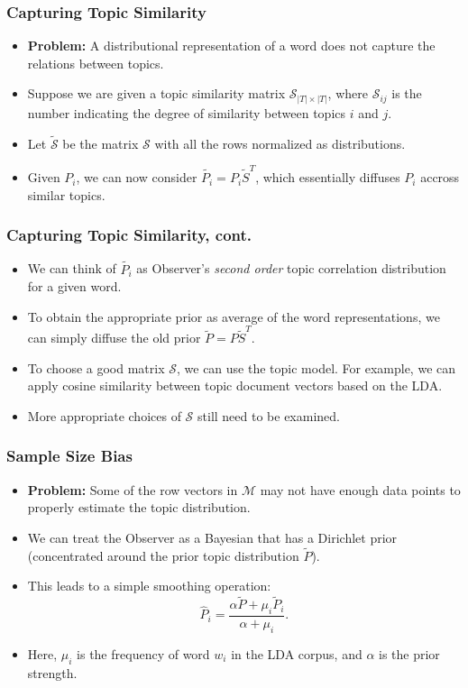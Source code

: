 \documentclass{beamer}
\newcommand\cS{{\mathcal S}}
\newcommand\cM{{\mathcal M}}
\begin{document}
\begin{frame}
\frametitle{Capturing Topic Similarity}
\begin{itemize}
\item {\bf Problem:} A distributional representation of a word does
  not capture the relations between topics.
\item Suppose we are given a topic similarity matrix
  $\cS_{|T|\times|T|}$, where $\cS_{ij}$ is the number indicating
  the degree of similarity between topics $i$ and $j$. 
\item Let $\tilde{\cS}$ be the matrix $\cS$ with all the rows normalized as
  distributions. 
\item Given $P_i$, we can now consider $\tilde{P_i}=P_i\tilde{S}^T$, which
  essentially diffuses $P_i$ accross similar topics.
\end{itemize}
\end{frame}

\begin{frame}
\frametitle{Capturing Topic Similarity, cont.}
\begin{itemize}
\item We can think of $\tilde{P_i}$ as Observer's {\em second order}
  topic correlation distribution for a given word.
\item To obtain the appropriate prior as average of the word
  representations, we can simply diffuse the old prior
  $\tilde{P}=P\tilde{S}^T$. 
\item To choose a good matrix $\cS$, we can use the topic model. For
  example, we can apply cosine similarity between topic document
  vectors based on the LDA. 
\item More appropriate choices of $\cS$ still need to be examined.
\end{itemize}
\end{frame}

\begin{frame}
\frametitle{Sample Size Bias}
\begin{itemize}
\item {\bf Problem:} Some of the row vectors in $\cM$ may not have
  enough data points to properly estimate the topic distribution.
\item We can treat the Observer as a Bayesian that has a Dirichlet
  prior (concentrated around the prior topic distribution
  $\tilde{P}$). 
\item This leads to a simple smoothing operation:
\begin{equation}
\widehat{P}_i=\frac{\alpha \tilde{P}+ \mu_i \tilde{P}_i}{\alpha+\mu_i}.
\end{equation}
\item Here, $\mu_i$ is the frequency of word $w_i$ in the LDA corpus,
  and $\alpha$ is the prior strength.
\end{itemize}
\end{frame}
\end{document}
